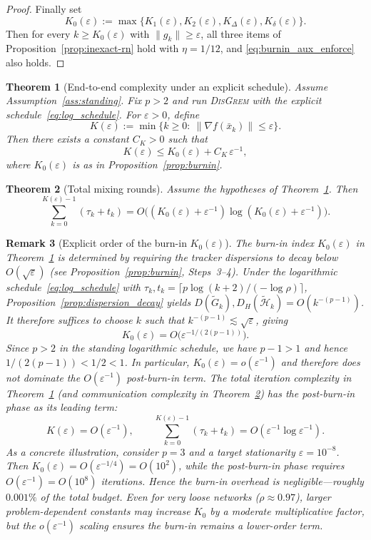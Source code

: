 \documentclass[11pt,a4paper]{article}
\def\cO{O}%
\newtheorem{theorem}{Theorem}[section]
\newtheorem{remark}[theorem]{Remark}
\newcommand{\cO}{\mathcal{O}}
\begin{document}
\begin{proof}
\smallskip
Finally set
\[
K_0(\varepsilon):=\max\{K_1(\varepsilon),K_2(\varepsilon),K_\Delta(\varepsilon),K_\delta(\varepsilon)\}.
\]
Then for every $k\ge K_0(\varepsilon)$ with $\|g_k\|\ge \varepsilon$, all three items of Proposition~\ref{prop:inexact-rn} hold with $\eta=1/12$,
and \eqref{eq:burnin_aux_enforce} also holds.
\end{proof}

\begin{theorem}[End-to-end complexity under an explicit schedule]\label{thm:end2end}
Assume Assumption~\ref{ass:standing}. Fix $p>2$ and run \textsc{DisGrem} with the explicit schedule~\eqref{eq:log_schedule}.
For $\varepsilon>0$, define
\[
K(\varepsilon):=\min\{k\ge 0:\ \|\nabla f(\bar x_k)\|\le \varepsilon\}.
\]
Then there exists a constant $C_K>0$ such that
\[
K(\varepsilon)\le K_0(\varepsilon)+C_K\,\varepsilon^{-1},
\]
where $K_0(\varepsilon)$ is as in Proposition~\ref{prop:burnin}.
\end{theorem}

\begin{theorem}[Total mixing rounds]\label{thm:comm}
Assume the hypotheses of Theorem~\ref{thm:end2end}. Then
\[
\sum_{k=0}^{K(\varepsilon)-1}(\tau_k+t_k)
=\cO\!\Big((K_0(\varepsilon)+\varepsilon^{-1})\log(K_0(\varepsilon)+\varepsilon^{-1})\Big).
\]
\end{theorem}

\begin{remark}[Explicit order of the burn-in $K_0(\varepsilon)$]\label{rem:burnin_order_app}
The burn-in index $K_0(\varepsilon)$ in Theorem~\ref{thm:end2end} is
determined by requiring the tracker dispersions to decay below
$\cO(\sqrt\varepsilon)$ (see Proposition~\ref{prop:burnin}, Steps~3--4).
Under the logarithmic schedule~\eqref{eq:log_schedule} with
$\tau_k,t_k=\lceil p\log(k+2)/(-\log\rho)\rceil$,
Proposition~\ref{prop:dispersion_decay} yields
$D(\tilde G_k),D_H(\tilde{\mathcal H}_k)=\cO(k^{-(p-1)})$.
It therefore suffices to choose $k$ such that $k^{-(p-1)}\lesssim\sqrt\varepsilon$,
giving
\[
K_0(\varepsilon)=\cO\!\big(\varepsilon^{-1/(2(p-1))}\big).
\]
Since $p>2$ in the standing logarithmic schedule, we have $p-1>1$
and hence $1/(2(p-1))<1/2<1$.
In particular, $K_0(\varepsilon)=o(\varepsilon^{-1})$ and therefore
\emph{does not dominate} the $\cO(\varepsilon^{-1})$ post-burn-in term.
The total iteration complexity in Theorem~\ref{thm:end2end}
(and communication complexity in Theorem~\ref{thm:comm}) has the
post-burn-in phase as its leading term:
\[
K(\varepsilon)=\cO(\varepsilon^{-1}),
\qquad
\sum_{k=0}^{K(\varepsilon)-1}(\tau_k+t_k)
=\cO(\varepsilon^{-1}\log\varepsilon^{-1}).
\]
As a concrete illustration, consider $p=3$ and a target stationarity
$\varepsilon=10^{-8}$.
Then $K_0(\varepsilon)=\cO(\varepsilon^{-1/4})=\cO(10^{2})$,
while the post-burn-in phase requires $\cO(\varepsilon^{-1})=\cO(10^{8})$
iterations.
Hence the burn-in overhead is negligible---roughly $0.001\%$
of the total budget.
Even for very loose networks ($\rho\approx0.97$), larger
problem-dependent constants may increase $K_0$ by a moderate
multiplicative factor, but the $o(\varepsilon^{-1})$ scaling ensures
the burn-in remains a lower-order term.
\end{remark}
\end{document}
